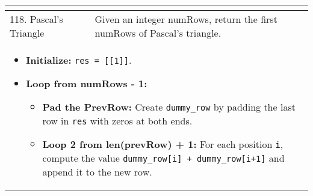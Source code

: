 \begin{summary}
\begin{center}
\begin{tabular}{ll}
{\begin{itemize}
                \end{itemize}                
            } \\
            \midrule
            118. Pascal's Triangle & Given an integer numRows, return the first numRows of Pascal's triangle. \\
            \multicolumn{2}{p{\linewidth}}{
                \begin{itemize}
                    \item \textbf{Initialize:} \texttt{res = [[1]]}.
                    \item \textbf{Loop from numRows - 1:}
                    \begin{itemize}
                        \item \textbf{Pad the PrevRow:} Create \texttt{dummy\_row} by padding the last row in \texttt{res} with zeros at both ends. 
                        \item \textbf{Loop 2 from len(prevRow) + 1:} For each position \texttt{i}, compute the value \texttt{dummy\_row[i] + dummy\_row[i+1]} and append it to the new row. 
                    \end{itemize}
                \end{itemize}                
            } \\
            \midrule
            \bottomrule
        \end{tabular}
    \end{center}
\end{summary}